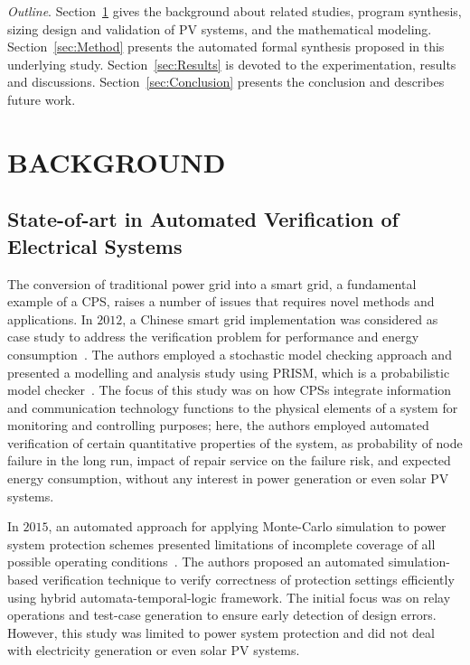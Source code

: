 \documentclass[review]{elsarticle}
\begin{document}
\textit{Outline}. Section~\ref{sec:Background} gives the background about related studies, 
program synthesis, sizing design and validation of PV systems, and the mathematical modeling. 
Section~\ref{sec:Method} presents the automated formal synthesis proposed 
in this underlying study. Section~\ref{sec:Results} is devoted to the experimentation, 
results and discussions. Section~\ref{sec:Conclusion} presents the conclusion and describes future work.
%
\section{BACKGROUND}
\label{sec:Background}

\subsection{State-of-art in Automated Verification of Electrical Systems}

The conversion of traditional power grid into a smart grid, a fundamental example of a CPS, 
raises a number of issues that requires novel methods and applications. In $2012$, a Chinese smart grid implementation was considered as case study to address the verification problem for performance and energy consumption~\cite{Yukseletall2012}. The authors employed a stochastic model checking approach and presented a modelling and analysis study using PRISM, which is a probabilistic model checker~\cite{KwiatkowskaNP11}. The focus of this study was on how CPSs integrate information and communication technology functions to the physical elements of a system for monitoring and controlling purposes; here, the authors employed automated verification of certain quantitative properties of the system, as probability of	 node failure in the long run, impact of repair service on the failure risk, and expected energy consumption, without any interest in power generation or even solar PV systems.

In $2015$, an automated approach for applying Monte-Carlo simulation to power system protection schemes presented limitations of incomplete coverage of all possible operating conditions~\cite{Sengupta2015}. The authors proposed an automated simulation-based verification technique to verify correctness of protection settings efficiently using hybrid automata-temporal-logic framework. The initial focus was on relay operations and test-case generation to ensure early detection of design errors. However, this study was limited to power system protection and did not deal with electricity generation or even solar PV systems.
\end{document}
